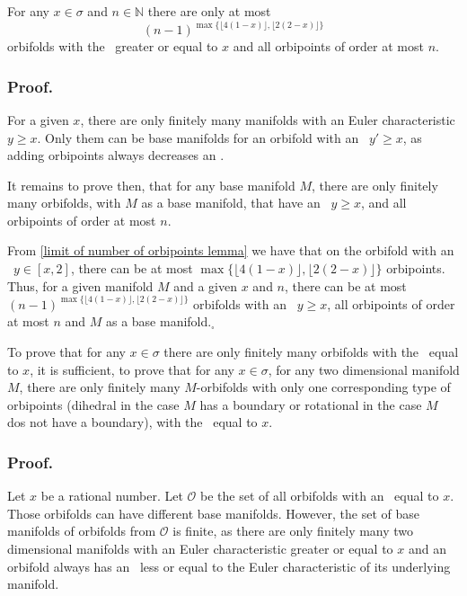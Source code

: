 
\begin{observation}\label{first_finiteness_theorem}
For any $x \in \sigma$ and $n \in \mathbb{N}$ there are only 
at most 
\begin{equation}
(n-1)^{\max \{\lfloor 4(1-x) \rfloor, \lfloor 2(2-x) \rfloor\}}
\end{equation} 
orbifolds 
with the \Eoc\ greater or equal to $x$ and all orbipoints of order at most $n$.
\end{observation}
\subsubsection{Proof.} 

For a given $x$, there are only finitely many manifolds 
with an Euler characteristic $y \geq x$. Only them can be 
base manifolds for an orbifold with an \Eoc\ $y'\geq x$, as adding orbipoints always 
decreases an \Eoc. 

It remains to prove then, that for any base manifold $M$, there are only finitely many orbifolds, 
with $M$ as a base manifold, that have 
 an \Eoc\ $y \geq x$, and all orbipoints of order at most $n$.

From \ref{limit of number of orbipoints lemma} we have that 
on the orbifold with an \Eoc\ $y \in [x,2]$, there can be at most 
$\max \{\lfloor 4(1-x) \rfloor, \lfloor 2(2-x) \rfloor\}$ orbipoints. 
Thus, for a given manifold $M$ and a given $x$ and $n$, there can be at most 
$(n-1)^{\max \{\lfloor 4(1-x) \rfloor, \lfloor 2(2-x) \rfloor\}}$ orbifolds with an \Eoc\ 
$y \geq x$, 
all orbipoints of order at most $n$ and $M$ as a base manifold.$_\square$ 

\begin{observation}\label{simplification of the finiteness theorem}
To prove that for any $x \in \sigma$ there are only finitely many orbifolds 
with the \Eoc\ equal to $x$, it is sufficient, to prove that 
for any $x \in \sigma$, for any two dimensional manifold $M$, there are only 
finitely many $M$-orbifolds with only one corresponding type of orbipoints (dihedral in the case 
$M$ has a boundary or rotational in the case $M$ dos not have a boundary), 
with the \Eoc\ equal to $x$.
\end{observation}
\subsubsection{Proof.}
Let $x$ be a rational number. 
Let $\mathcal{O}$ be the set of all orbifolds with 
an \Eoc\ equal to $x$. 
Those orbifolds can have different base manifolds. However, the set of base manifolds of 
orbifolds from $\mathcal{O}$ is finite, as there are only finitely many 
two dimensional manifolds with an Euler characteristic greater or equal to $x$ and an 
orbifold always has 
an \Eoc\ less or equal to the Euler characteristic of its underlying manifold. 

